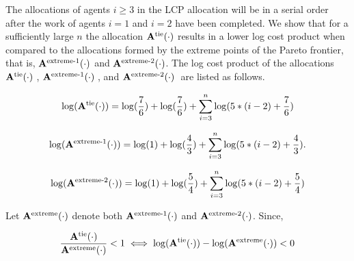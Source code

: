\documentclass[letterpaper]{article} %
\theoremstyle{definition}
\newenvironment{customexample}[1]
  {\renewcommand\theinnercustomexample{#1}\innercustomexample}
  {\endinnercustomexample}
\begin{document}
\begin{customexample}{1}
The allocations of agents $i \geq 3$ in the LCP allocation will be in a serial order after the work of agents $i = 1$ and $i = 2$ have been completed. We show that for a sufficiently large $n$ the allocation $\mathbf{A}^{\textnormal{tie}}(\cdot)$ results in a lower log cost product when compared to the allocations formed by the extreme points of the Pareto frontier, that is, $\mathbf{A}^{\textnormal{extreme-1}}(\cdot)$ and $\mathbf{A}^{\textnormal{extreme-2}}(\cdot)$. The log cost product of the allocations $\mathbf{A}^{\textnormal{tie}}(\cdot)\;$, $\mathbf{A}^{\textnormal{extreme-1}}(\cdot)\;$, and $\mathbf{A}^{\textnormal{extreme-2}}(\cdot)\;$ are listed as follows.
\begin{linenomath}
\begin{equation*}
\log(\mathbf{A}^{\textnormal{tie}}(\cdot)) = \log(\dfrac{7}{6}) + \log(\dfrac{7}{6}) + \displaystyle \sum_{i = 3}^{n} \log(5 * (i -2) + \dfrac{7}{6})
\end{equation*}
\end{linenomath}
\begin{linenomath}
\begin{equation*}
    \log(\mathbf{A}^{\textnormal{extreme-1}}(\cdot)) = \log(1) + \log(\dfrac{4}{3}) + \displaystyle \sum_{i = 3}^{n} \log(5 * (i -2) + \dfrac{4}{3}).
\end{equation*}
\end{linenomath}
\begin{linenomath}
\begin{equation*}
    \log(\mathbf{A}^{\textnormal{extreme-2}}(\cdot)) = \log(1) + \log(\dfrac{5}{4}) + \displaystyle \sum_{i = 3}^{n} \log(5 * (i -2) + \dfrac{5}{4}) \\[4 pt]
\end{equation*}
\end{linenomath}

Let $\mathbf{A}^{\textnormal{extreme}}(\cdot)$ denote both $\mathbf{A}^{\textnormal{extreme-1}}(\cdot)$ and $\mathbf{A}^{\textnormal{extreme-2}}(\cdot)$. Since, 
\begin{linenomath}
\begin{equation*}
    \displaystyle \dfrac{\mathbf{A}^{\textnormal{tie}}(\cdot)}{\mathbf{A}^{\textnormal{extreme}}(\cdot)}  <  1  \iff \log(\mathbf{A}^{\textnormal{tie}}(\cdot)) - \log(\mathbf{A}^{\textnormal{extreme}}(\cdot)) < 0
\end{equation*}
\end{linenomath}


\end{customexample}
\end{document}
